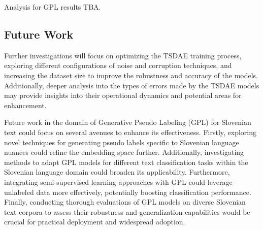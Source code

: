 \documentclass[fleqn,moreauthors,10pt]{ds_report}
\begin{document}
Analysis for GPL results TBA.

\subsection*{Future Work}

Further investigations will focus on optimizing the TSDAE training process, exploring different configurations of noise and corruption techniques, and increasing the dataset size to improve the robustness and accuracy of the models. Additionally, deeper analysis into the types of errors made by the TSDAE models may provide insights into their operational dynamics and potential areas for enhancement.


Future work in the domain of Generative Pseudo Labeling (GPL) for Slovenian text could focus on several avenues to enhance its effectiveness. Firstly, exploring novel techniques for generating pseudo labels specific to Slovenian language nuances could refine the embedding space further. Additionally, investigating methods to adapt GPL models for different text classification tasks within the Slovenian language domain could broaden its applicability. Furthermore, integrating semi-supervised learning approaches with GPL could leverage unlabeled data more effectively, potentially boosting classification performance. Finally, conducting thorough evaluations of GPL models on diverse Slovenian text corpora to assess their robustness and generalization capabilities would be crucial for practical deployment and widespread adoption.






\end{document}
